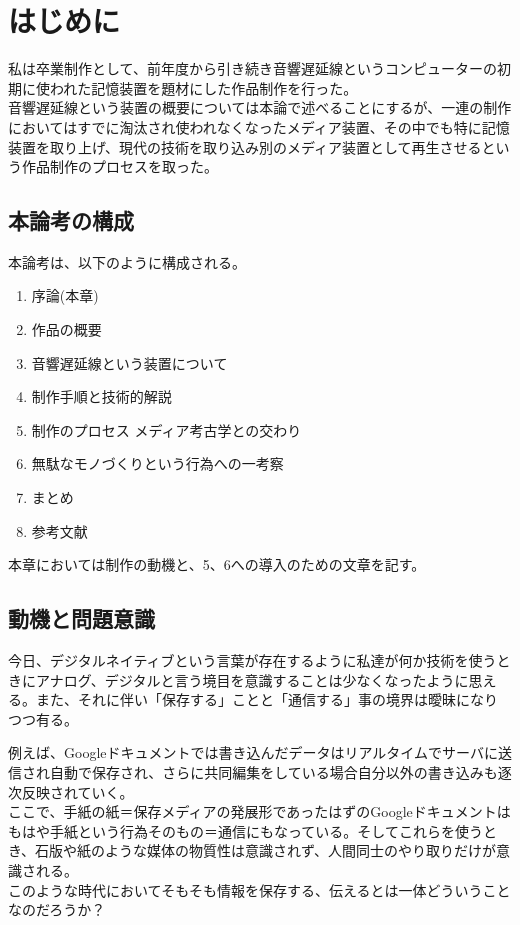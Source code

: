 \section{はじめに}\label{ux306fux3058ux3081ux306b}

私は卒業制作として、前年度から引き続き音響遅延線というコンピューターの初期に使われた記憶装置を題材にした作品制作を行った。\\
音響遅延線という装置の概要については本論で述べることにするが、一連の制作においてはすでに淘汰され使われなくなったメディア装置、その中でも特に記憶装置を取り上げ、現代の技術を取り込み別のメディア装置として再生させるという作品制作のプロセスを取った。

\subsection{本論考の構成}\label{ux672cux8ad6ux8003ux306eux69cbux6210}

本論考は、以下のように構成される。

\begin{enumerate}
\def\labelenumi{\arabic{enumi}.}
\tightlist
\item
  序論(本章)
\item
  作品の概要
\item
  音響遅延線という装置について
\item
  制作手順と技術的解説
\item
  制作のプロセス メディア考古学との交わり
\item
  無駄なモノづくりという行為への一考察
\item
  まとめ
\item
  参考文献
\end{enumerate}

本章においては制作の動機と、5、6への導入のための文章を記す。

\subsection{動機と問題意識}\label{ux52d5ux6a5fux3068ux554fux984cux610fux8b58}

今日、デジタルネイティブという言葉が存在するように私達が何か技術を使うときにアナログ、デジタルと言う境目を意識することは少なくなったように思える。また、それに伴い「保存する」ことと「通信する」事の境界は曖昧になりつつ有る。

例えば、Googleドキュメントでは書き込んだデータはリアルタイムでサーバに送信され自動で保存され、さらに共同編集をしている場合自分以外の書き込みも逐次反映されていく。\\
ここで、手紙の紙＝保存メディアの発展形であったはずのGoogleドキュメントはもはや手紙という行為そのもの＝通信にもなっている。そしてこれらを使うとき、石版や紙のような媒体の物質性は意識されず、人間同士のやり取りだけが意識される。\\
このような時代においてそもそも情報を保存する、伝えるとは一体どういうことなのだろうか？

